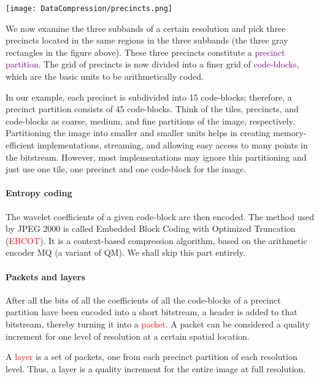 \documentclass[a4paper, 11pt, openany]{book}
\numberwithin{equation}{section}
\theoremstyle{plain}
\theoremstyle{definition}
\newcommand{\Important}[1]{\textcolor{red}{#1}}
\newcommand{\Define}[1]{\textcolor{purple}{#1}}
\begin{document}
\begin{center}
    \texttt{[image: DataCompression/precincts.png]}
\end{center}

We now examine the three subbands of a certain resolution and pick three precincts located in the same regions in the three subbands (the three gray rectangles in the figure above). These three precincts constitute a \Define{precinct partition}. The grid of precincts is now divided into a finer grid of \Define{code-blocks}, which are the basic units to be arithmetically coded. 

In our example, each precinct is subdivided into 15 code-blocks; therefore, a precinct partition consists of 45 code-blocks. Think of the tiles, precincts, and code-blocks as coarse, medium, and fine partitions of the image, respectively. Partitioning the image into smaller and smaller units helps in creating memory-efficient implementations, streaming, and allowing easy access to many points in the bitstream.  However, most implementations may ignore this partitioning and just use one tile, one precinct and one code-block for the image.

\paragraph{Entropy coding}
The wavelet coefficients of a given code-block are then encoded. The method used by JPEG 2000 is called Embedded Block Coding with Optimized Truncation (\Important{EBCOT}). It is a context-based compression algorithm, based on the arithmetic encoder MQ (a variant of QM). We shall skip this part entirely.



\paragraph{Packets and layers}

After all the bits of all the coefficients of all the code-blocks of a precinct
partition have been encoded into a short bitstream, a header is added to that bitstream, thereby turning it into a \Important{packet}. A packet can be considered a
quality increment for one level of resolution at a certain spatial location.

A \Important{layer} is a set of packets, one from each precinct partition of each resolution level. Thus, a layer is a quality increment for the entire
image at full resolution.
\end{document}
